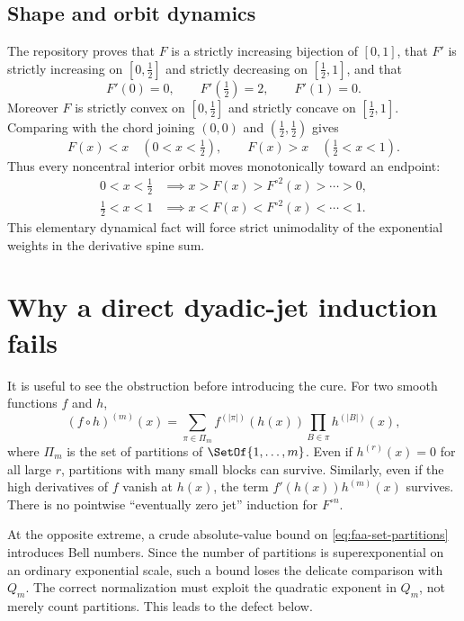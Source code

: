 \documentclass[11pt,oneside]{article}
\theoremstyle{definition}
\theoremstyle{remark}
\newcommand{\comp}{\mathbin{\circ}}
\newcommand{\half}{\tfrac12}
\begin{document}
\subsection{Shape and orbit dynamics}

The repository proves that $F$ is a strictly increasing bijection of $[0,1]$, that
$F'$ is strictly increasing on $[0,\half]$ and strictly decreasing on
$[\half,1]$, and that
\begin{equation}
 F'(0)=0,\qquad F'(\half)=2,\qquad F'(1)=0.
 \label{eq:slope-values}
\end{equation}
Moreover $F$ is strictly convex on $[0,\half]$ and strictly concave on
$[\half,1]$.  Comparing with the chord joining $(0,0)$ and $(\half,\half)$ gives
\begin{equation}
  F(x)<x\quad(0<x<\half),
  \qquad
  F(x)>x\quad(\half<x<1).
  \label{eq:drift}
\end{equation}
Thus every noncentral interior orbit moves monotonically toward an endpoint:
\begin{align}
 0<x<\half&\implies x>F(x)>F^{\comp2}(x)>\cdots>0,
 \label{eq:left-orbit}\\
 \half<x<1&\implies x<F(x)<F^{\comp2}(x)<\cdots<1.
 \label{eq:right-orbit}
\end{align}
This elementary dynamical fact will force strict unimodality of the exponential
weights in the derivative spine sum.

\section{Why a direct dyadic-jet induction fails}

It is useful to see the obstruction before introducing the cure.  For two smooth
functions $f$ and $h$,
\begin{equation}
 (f\comp h)^{(m)}(x)
 =\sum_{\pi\in\Pi_m}
 f^{(|\pi|)}(h(x))\prod_{B\in\pi}h^{(|B|)}(x),
 \label{eq:faa-set-partitions}
\end{equation}
where $\Pi_m$ is the set of partitions of $\SetOf{1,\ldots,m}$.  Even if
$h^{(r)}(x)=0$ for all large $r$, partitions with many small blocks can survive.
Similarly, even if the high derivatives of $f$ vanish at $h(x)$, the term
$f'(h(x))h^{(m)}(x)$ survives.  There is no pointwise ``eventually zero jet''
induction for $F^{\comp n}$.

At the opposite extreme, a crude absolute-value bound on \eqref{eq:faa-set-partitions}
introduces Bell numbers.  Since the number of partitions is superexponential on an
ordinary exponential scale, such a bound loses the delicate comparison with $Q_m$.
The correct normalization must exploit the quadratic exponent in $Q_m$, not merely
count partitions.  This leads to the defect below.
\end{document}
